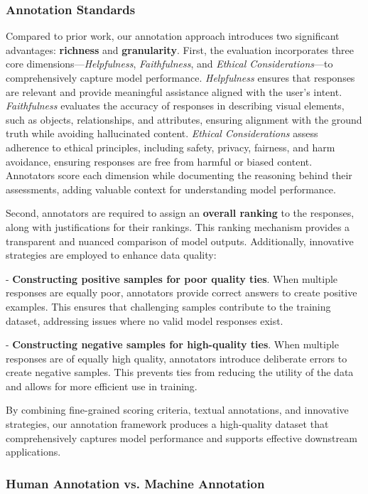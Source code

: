 \subsubsection{Annotation Standards}
Compared to prior work, our annotation approach introduces two significant advantages: \textbf{richness} and \textbf{granularity}. First, the evaluation incorporates three core dimensions—\textit{Helpfulness}, \textit{Faithfulness}, and \textit{Ethical Considerations}—to comprehensively capture model performance. \textit{Helpfulness} ensures that responses are relevant and provide meaningful assistance aligned with the user’s intent. \textit{Faithfulness} evaluates the accuracy of responses in describing visual elements, such as objects, relationships, and attributes, ensuring alignment with the ground truth while avoiding hallucinated content. \textit{Ethical Considerations} assess adherence to ethical principles, including safety, privacy, fairness, and harm avoidance, ensuring responses are free from harmful or biased content. Annotators score each dimension while documenting the reasoning behind their assessments, adding valuable context for understanding model performance. 

Second, annotators are required to assign an \textbf{overall ranking} to the responses, along with justifications for their rankings. This ranking mechanism provides a transparent and nuanced comparison of model outputs. Additionally, innovative strategies are employed to enhance data quality:

- \textbf{Constructing positive samples for poor quality ties}. When multiple responses are equally poor, annotators provide correct answers to create positive examples. This ensures that challenging samples contribute to the training dataset, addressing issues where no valid model responses exist.


- \textbf{Constructing negative samples for high-quality ties}. When multiple responses are of equally high quality, annotators introduce deliberate errors to create negative samples. This prevents ties from reducing the utility of the data and allows for more efficient use in training.

By combining fine-grained scoring criteria, textual annotations, and innovative strategies, our annotation framework produces a high-quality dataset that comprehensively captures model performance and supports effective downstream applications.




\subsubsection{Human Annotation vs. Machine Annotation}

